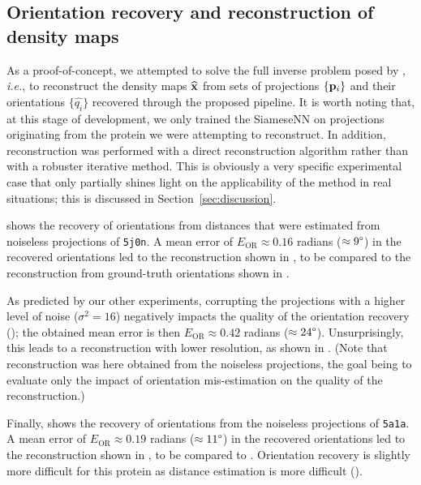 
\subsection{Orientation recovery and reconstruction of density maps}\label{sec:results:orientation-recovery:reconstruction}

As a proof-of-concept, we attempted to solve the full inverse problem posed by , \textit{i.e.}, to reconstruct the density maps $\widehat{\mathbf{x}}$ from sets of projections $\{ \mathbf{p}_i \}$ and their orientations $\{ \widehat{q_i} \}$ recovered through the proposed pipeline.
It is worth noting that, at this stage of development, we only trained the SiameseNN on projections originating from the protein we were attempting to reconstruct. In addition, reconstruction was performed with a direct reconstruction algorithm rather than with a robuster iterative method. This is obviously a very specific experimental case that only partially shines light on the applicability of the method in real situations; this is discussed in Section~\ref{sec:discussion}.

 shows the recovery of orientations from distances that were estimated from noiseless projections of \texttt{5j0n}.
A mean error of $E_\text{OR} \approx 0.16$ radians ($\approx 9\degree$) in the recovered orientations led to the reconstruction shown in , to be compared to the reconstruction from ground-truth orientations shown in .

As predicted by our other experiments, corrupting the projections with a higher level of noise ($\sigma^2=16$) negatively impacts the quality of the orientation recovery (); the obtained mean error is then $E_\text{OR} \approx 0.42$ radians ($\approx 24\degree$).
Unsurprisingly, this leads to a reconstruction with lower resolution, as shown in . (Note that reconstruction was here obtained from the noiseless projections, the goal being to evaluate only the impact of orientation mis-estimation on the quality of the reconstruction.)

Finally,  shows the recovery of orientations from the noiseless projections of \texttt{5a1a}.
A mean error of $E_\text{OR} \approx 0.19$ radians ($\approx 11\degree$) in the recovered orientations led to the reconstruction shown in , to be compared to .
Orientation recovery is slightly more difficult for this protein as distance estimation is more difficult ().

